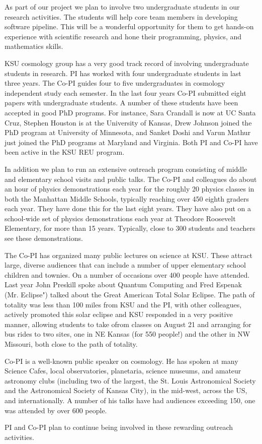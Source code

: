 As part of our project we plan to involve two undergraduate students in our
research activities. The students will help core team members in developing
software pipeline. This will be a wonderful opportunity for them to get
hands-on experience with scientific research and hone their programming,
physics, and mathematics skills. 

KSU cosmology group has a very good track record of involving undergraduate
students in research. PI has worked with four undergraduate students in last
three years. The Co-PI guides four to five undergraduates in cosmology
independent study each semester. In the last four years Co-PI submitted eight
papers with undergraduate students. A number of these students have been
accepted in good PhD programs. For instance, Sara Crandall is now at UC Santa
Cruz, Stephen Houston is at the University of Kansas, Drew Johnson joined the
PhD program at University of Minnesota, and Sanket Doshi and Varun Mathur just
joined the PhD programs at Maryland and Virginia. Both PI and Co-PI have been
active in the KSU REU program.

In addition we plan to run an extensive outreach program consisting of middle
and elementary school visits and public talks. The Co-PI and colleagues do about
an hour of physics demonstrations each year for the roughly 20 physics classes
in both the Manhattan Middle Schools, typically reaching over 450 eighth
graders each year. They have done this for the last eight years. They have also
put on a school-wide set of physics demonstrations each year at Theodore
Roosevelt Elementary, for more than 15 years. Typically, close to 300 students
and teachers see these demonstrations.

The Co-PI has organized many public lectures on science at KSU. These attract
large, diverse audiences that can include a number of upper elementary school
children and townies. On a number of occasions over 400 people have attended.
Last year John Preskill spoke about Quantum Computing and Fred Espenak (Mr.
Eclipse") talked about the Great American Total Solar Eclipse. The path of
totality was less than 100 miles from KSU and the PI, with other colleagues,
actively promoted this solar eclipse and KSU responded in a very positive
manner, allowing students to take ofrom classes on August 21 and arranging for
bus rides to two sites, one in NE Kansas (for 550 people!) and the other in NW
Missouri, both close to the path of totality.

Co-PI is a well-known public speaker on cosmology. He has spoken at many
Science Cafes, local observatories, planetaria, science museums, and amateur
astronomy clubs (including two of the largest, the St. Louis Astronomical
Society and the Astronomical Society of Kansas City), in the mid-west, across
the US, and internationally. A number of his talks have had audiences exceeding
150, one was attended by over 600 people.

PI and Co-PI plan to continue being involved in these rewarding outreach
activities.
